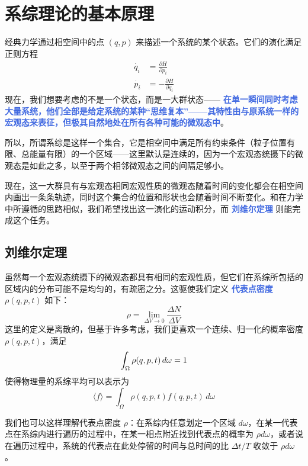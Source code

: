 
\chapter{系综理论的基本原理}\label{cha:系综理论的基本原理}

经典力学通过相空间中的点 $(q,p)$ 来描述一个系统的某个状态。它们的演化满足正则方程
\begin{align}
    \dot{q_i} &= \frac{\partial H}{\partial p_i} \\
    \dot{p_i} &= -\frac{\partial H}{\partial q_i}
\end{align}
现在，我们想要考虑的不是一个状态，而是一大群状态——  \textcolor{RoyalBlue}{\textbf{\kaishu 在单一瞬间同时考虑大量系统，他们全部是给定系统的某种“思维复本”——其特性由与原系统一样的宏观态来表征，但极其自然地处在所有各种可能的微观态中}}。

所以，所谓系综是这样一个集合，它是相空间中满足所有约束条件（粒子位置有限、总能量有限）的一个区域——这里默认是连续的，因为一个宏观态统摄下的微观态是如此之多，以至于两个相邻微观态之间的间隔足够小。

现在，这一大群具有与宏观态相同宏观性质的微观态随着时间的变化都会在相空间内画出一条条轨迹，同时这个集合的位置和形状也会随着时间不断变化。和在力学中所遵循的思路相似，我们希望找出这一演化的运动积分，而 \textcolor{RoyalBlue}{\textbf{\kaishu 刘维尔定理}} 则能完成这个任务。

\section{刘维尔定理}\label{sec:刘维尔定理}

虽然每一个宏观态统摄下的微观态都具有相同的宏观性质，但它们在系综所包括的区域内的分布可能不是均匀的，有疏密之分。这驱使我们定义 \textcolor{RoyalBlue}{\textbf{\kaishu 代表点密度}} $\rho(q,p,t)$ 如下：
\begin{equation}
    \rho = \lim_{\Delta V\rightarrow 0} \frac{\Delta N}{\Delta V} 
\end{equation}
这里的定义是离散的，但基于许多考虑，我们更喜欢一个连续、归一化的概率密度 $\rho(q,p,t)$，满足
\begin{equation}
    \int_\Omega \rho(q,p,t)\,d\omega = 1 \\
\end{equation}
使得物理量的系综平均可以表示为
\begin{equation}
    \langle f \rangle =  \int_\Omega \rho(q,p,t)f(q,p,t)\,d\omega
\end{equation}

我们也可以这样理解代表点密度 $\rho$：在系综内任意划定一个区域 $d \omega$，在某一代表点在系综内进行遍历的过程中，在某一相点附近找到代表点的概率为 $\rho d \omega$，或者说在遍历过程中，系统的代表点在此处停留的时间与总时间的比 $\Delta t / T$  收敛于 $\rho d \omega$ 。

